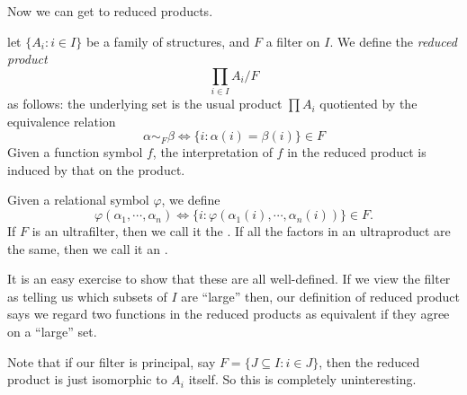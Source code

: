 \documentclass[a4paper]{article}
\begin{document}

Now we can get to reduced products.
\begin{defi}
  let $\{A_i: i \in I\}$ be a family of structures, and $F$ a filter on $I$. We define the \emph{reduced product}
  \[
    \prod_{i \in I} A_i / F
  \]
  as follows: the underlying set is the usual product $\prod A_i$ quotiented by the equivalence relation
  \[
    \alpha \sim_F \beta \Longleftrightarrow \{i : \alpha(i) = \beta(i)\} \in F
  \]
  Given a function symbol $f$, the interpretation of $f$ in the reduced product is induced by that on the product.

  Given a relational symbol $\varphi$, we define
  \[
    \varphi(\alpha_1, \cdots, \alpha_n) \Longleftrightarrow \{i : \varphi(\alpha_1(i), \cdots, \alpha_n(i))\} \in F.
  \]
  If $F$ is an ultrafilter, then we call it the . If all the factors in an ultraproduct are the same, then we call it an .
\end{defi}
It is an easy exercise to show that these are all well-defined. If we view the filter as telling us which subsets of $I$ are ``large'' then, our definition of reduced product says we regard two functions in the reduced products as equivalent if they agree on a ``large'' set.

Note that if our filter is principal, say $F = \{J \subseteq I: i \in J\}$, then the reduced product is just isomorphic to $A_i$ itself. So this is completely uninteresting.
\end{document}

